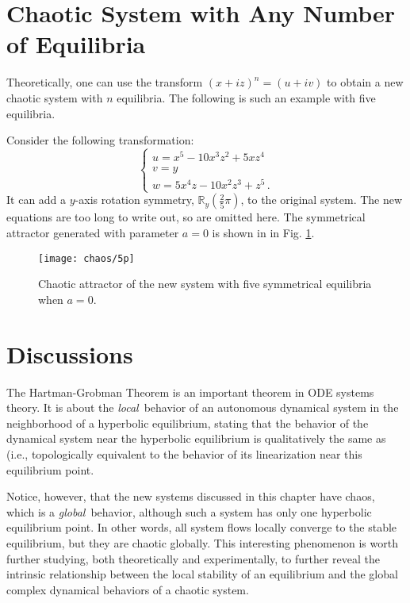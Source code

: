 \section{Chaotic System with Any Number of Equilibria}

Theoretically, one can use the transform $(x+iz)^{n}=(u+iv)$ to
obtain a new chaotic system with $n$ equilibria. The following is such an example with five equilibria.

Consider the following transformation:
\begin{equation}\label{tran5}
\left\{
\begin{array}{l}
u = x^5-10x^3z^2+5xz^4\\
v = y\\
w = 5x^4z-10x^2z^3+z^5\,.
\end{array}
\right.
\end{equation} %
It can add a $y$-axis rotation symmetry, $\mathbb{R}_{y}(\frac{2}{5}\pi)$, to the original system. The new equations are too long to write out, so are omitted here. The symmetrical attractor generated with parameter $a=0$ is shown in in Fig. \ref{5}.

\begin{figure}
\centering
\texttt{[image: chaos/5p]}
\caption{Chaotic attractor of the new system with five symmetrical equilibria when $a=0$.}\label{5}
\end{figure}

\section{Discussions}
The Hartman-Grobman Theorem is an important theorem in ODE systems theory. It is
about the \emph{local\,} behavior
of an autonomous dynamical system in the neighborhood of a hyperbolic
equilibrium,
stating that the behavior of the dynamical system near the hyperbolic
equilibrium is
qualitatively the same as (i.e., topologically equivalent to the behavior of its linearization near this equilibrium point.

Notice, however, that the new systems discussed in this chapter have chaos,
which is a \emph{global\,} behavior, although such a system
has only one hyperbolic equilibrium point. In other words, all system flows
locally converge
to the stable equilibrium, but they are chaotic globally. This interesting
phenomenon is
worth further studying, both theoretically and experimentally, to further reveal
the intrinsic relationship between the local stability of an equilibrium and the
global complex dynamical behaviors of a chaotic system.



